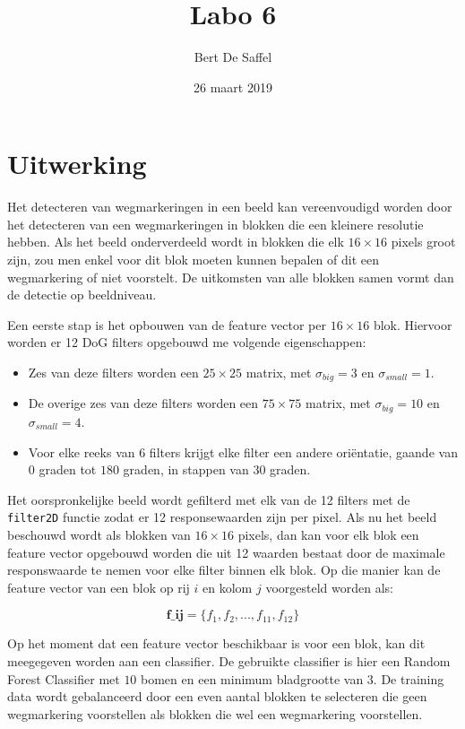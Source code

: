 \documentclass{article}
\begin{document}
	\title{Labo 6}
	\author{Bert De Saffel}
	\date{26 maart 2019}
	\maketitle
	
\section{Uitwerking}
Het detecteren van wegmarkeringen in een beeld kan vereenvoudigd worden door het detecteren van een wegmarkeringen in blokken die een kleinere resolutie hebben. Als het beeld onderverdeeld wordt in blokken die elk $16 \times 16$ pixels groot zijn, zou men enkel voor dit blok moeten kunnen bepalen of dit een wegmarkering of niet voorstelt. De uitkomsten van alle blokken samen vormt dan de detectie op beeldniveau.

Een eerste stap is het opbouwen van de feature vector per $16 \times 16$ blok. Hiervoor worden er 12 DoG filters opgebouwd me volgende eigenschappen:
\begin{itemize}
	\item Zes van deze filters worden een $25 \times 25$ matrix, met $\sigma_{big} = 3$ en $\sigma_{small} = 1$.
	\item De overige zes van deze filters worden een $75 \times 75$ matrix, met $\sigma_{big} = 10$ en $\sigma_{small} = 4$.
	\item Voor elke reeks van 6 filters krijgt elke filter een andere oriëntatie, gaande van $0$ graden tot $180$ graden, in stappen van $30$ graden.
\end{itemize}


Het oorspronkelijke beeld wordt gefilterd met elk van de 12 filters met de \texttt{filter2D} functie zodat er 12 responsewaarden zijn per pixel. Als nu het beeld beschouwd wordt als blokken van $16 \times 16$ pixels, dan kan voor elk blok een feature vector opgebouwd worden die uit 12 waarden bestaat door de maximale responswaarde te nemen voor elke filter binnen elk blok. Op die manier kan de feature vector van een blok op rij $i$ en kolom $j$ voorgesteld worden als:

$$\textbf{f_{ij}} = \{f_1, f_2, ..., f_{11}, f_{12}\}$$

Op het moment dat een feature vector beschikbaar is voor een blok, kan dit meegegeven worden aan een classifier. De gebruikte classifier is hier een Random Forest Classifier met $10$ bomen en een minimum bladgrootte van $3$. De training data wordt gebalanceerd door een even aantal blokken te selecteren die geen wegmarkering voorstellen als blokken die wel een wegmarkering voorstellen.
\end{document}

